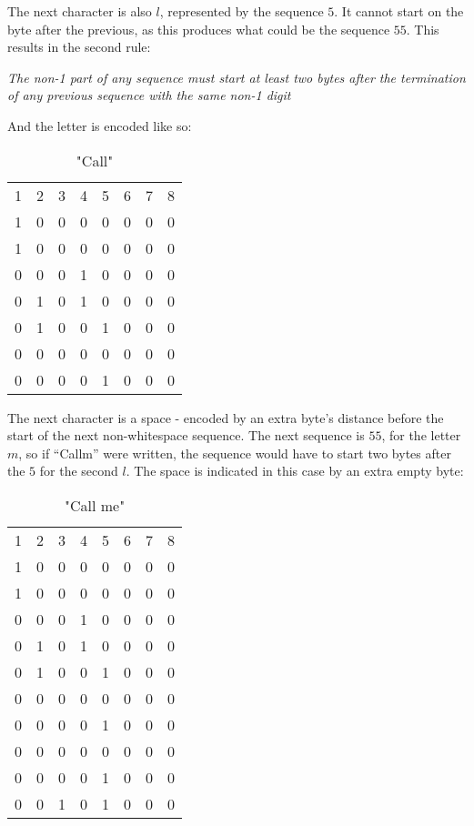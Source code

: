 \documentclass{article}
\begin{document}
The next character is also $l$, represented by the sequence $5$.  It cannot start on the byte after the previous, as this produces what could be the sequence $55$.  This results in the second rule:

\emph{The non-1 part of any sequence must start at least two bytes after the termination of any previous sequence with the same non-1 digit}

And the letter is encoded like so:

\begin{table}
    \centering
    \begin{tabular}{cccccccc}
        1 & 2 & 3 & 4 & 5 & 6 & 7 & 8\\
        1 & 0 & 0 & 0 & 0 & 0 & 0 & 0\\
        1 & 0 & 0 & 0 & 0 & 0 & 0 & 0\\
        0 & 0 & 0 & 1 & 0 & 0 & 0 & 0\\
        0 & 1 & 0 & 1 & 0 & 0 & 0 & 0\\
        0 & 1 & 0 & 0 & 1 & 0 & 0 & 0\\
        0 & 0 & 0 & 0 & 0 & 0 & 0 & 0\\
        0 & 0 & 0 & 0 & 1 & 0 & 0 & 0\\
    \end{tabular}
    \caption{"Call"}
    \label{tab:my_label}
\end{table}

The next character is a space - encoded by an extra byte's distance before the start of the next non-whitespace sequence.  The next sequence is $55$, for the letter $m$, so if ``Callm'' were written, the sequence would have to start two bytes after the $5$ for the second $l$.  The space is indicated in this case by an extra empty byte:

\begin{table}
    \centering
    \begin{tabular}{cccccccc}
        1 & 2 & 3 & 4 & 5 & 6 & 7 & 8\\
        1 & 0 & 0 & 0 & 0 & 0 & 0 & 0\\
        1 & 0 & 0 & 0 & 0 & 0 & 0 & 0\\
        0 & 0 & 0 & 1 & 0 & 0 & 0 & 0\\
        0 & 1 & 0 & 1 & 0 & 0 & 0 & 0\\
        0 & 1 & 0 & 0 & 1 & 0 & 0 & 0\\
        0 & 0 & 0 & 0 & 0 & 0 & 0 & 0\\
        0 & 0 & 0 & 0 & 1 & 0 & 0 & 0\\
        0 & 0 & 0 & 0 & 0 & 0 & 0 & 0\\
        0 & 0 & 0 & 0 & 1 & 0 & 0 & 0\\
        0 & 0 & 1 & 0 & 1 & 0 & 0 & 0\\
    \end{tabular}
    \caption{"Call me"}
    \label{tab:my_label}
\end{table}
\end{document}
